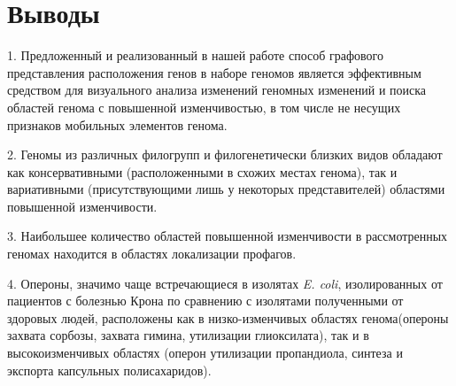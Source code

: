 \section*{Выводы}

1. Предложенный и реализованный в нашей работе способ графового представления расположения генов в наборе геномов является эффективным средством для визуального анализа изменений геномных изменений и поиска областей генома с повышенной изменчивостью, в том числе не несущих признаков мобильных элементов генома.

2. Геномы из различных филогрупп и филогенетически близких видов обладают как консервативными (расположенными в схожих местах генома), так и вариативными (присутствующими лишь у некоторых представителей) областями повышенной изменчивости.

3. Наибольшее количество областей повышенной изменчивости в рассмотренных геномах находится в областях локализации профагов.

4. Опероны, значимо чаще встречающиеся в изолятах \textit{E. coli}, изолированных от пациентов с болезнью Крона по сравнению с изолятами полученными от здоровых людей, расположены как в низко-изменчивых областях генома(опероны захвата сорбозы, захвата гимина, утилизации глиоксилата), так и в высокоизменчивых областях (оперон утилизации пропандиола, синтеза и экспорта капсульных полисахаридов).




